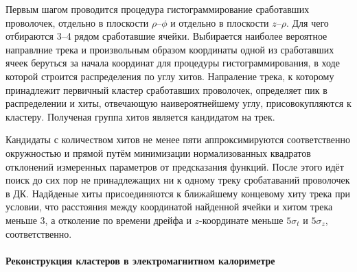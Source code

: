 Первым шагом проводится процедура гистограммирование сработавших проволочек,
отдельно в плоскости $\rho$--$\phi$ и отдельно в плоскости $z$--$\rho$.
Для чего отбираются 3--4 рядом сработавшие ячейки.
Выбирается наиболее вероятное направлние трека и произвольным образом координаты одной из сработавших ячеек беруться за начала координат для процедуры гистограммирования,
в ходе которой строится распределения по углу хитов.
Напраление трека,
к которому принадлежит первичный кластер сработавших проволочек,
определяет пик в распределении и хиты,
отвечающую наивероятнейшему углу,
присовокупляются к кластеру.
Полученая группа хитов является кандидатом на трек.

Кандидаты с количеством хитов не менее пяти аппроксимируются соответственно окружностью и прямой
путём минимизации нормализованных квадратов отклонений измеренных параметров от предсказания функций.
После этого идёт поиск до сих пор не принадлежащих ни к одному треку сробатаваний проволочек в ДК.
Надйденые хиты присоединяются к ближайшему концевому хиту трека при условии,
что расстояния между координатой найденной ячейки и хитом трека меньше \SI{3}{\cmr},
а отколение по времени дрейфа и $z$-координате меньше $5 \sigma_t$
и $5 \sigma_z$, соответственно.




\paragraph{Реконструкция кластеров в электромагнитном калориметре}


